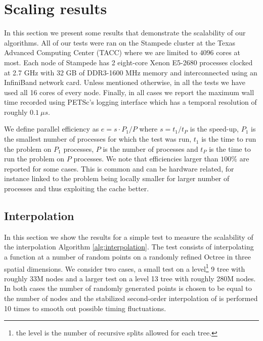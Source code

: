 \section{Scaling results} \label{sec:scaling}
In this section we present some results that demonstrate the scalability of our algorithms. All of our tests were ran on the Stampede cluster at the Texas Advanced Computing Center (TACC) where we are limited to $4096$ cores at most. Each node of Stampede has 2 eight-core Xenon E5-2680 processes clocked at 2.7 GHz with 32 GB of DDR3-1600 MHz memory and interconnected using an InfiniBand network card. Unless mentioned otherwise, in all the tests we have used all 16 cores of every node. Finally, in all cases we report the maximum wall time recorded using PETSc's logging interface which has a temporal resolution of roughly $0.1 \: \mu s$.

We define parallel efficiency as $e=s\cdot P_1 / P$ where $s=t_1/t_P$ is the speed-up, $P_1$ is the smallest number of processes for which the test was run, $t_1$ is the time to run the problem on $P_1$ processes, $P$ is the number of processes and $t_P$ is the time to run the problem on $P$ processes. We note that efficiencies larger than $100\%$ are reported for some cases. This is common and can be hardware related, for instance linked to the problem being locally smaller for larger number of processes and thus exploiting the cache better.

\subsection{Interpolation}
In this section we show the results for a simple test to measure the scalability of the interpolation Algorithm \ref{alg:interpolation}. The test consists of interpolating a function at a number of random points on a randomly refined Octree in three spatial dimensions. We consider two cases, a small test on a level\footnote{the level is the number of recursive splits allowed for each tree.} 9 tree with roughly 33M nodes and a larger test on a level 13 tree with roughly 280M nodes. In both cases the number of randomly generated points is chosen to be equal to the number of nodes and the stabilized second-order interpolation of \cite{Min;Gibou:07:A-second-order-accur} is performed 10 times to smooth out possible timing fluctuations.

